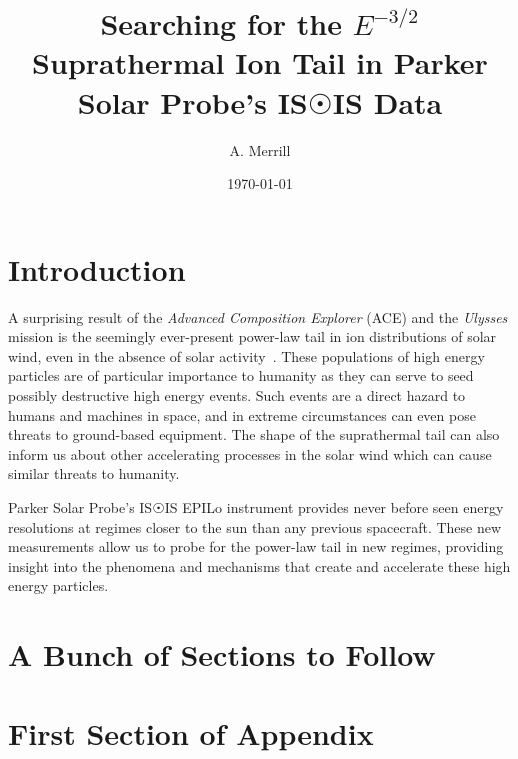 \documentclass[letterpaper,11pt]{article}
\begin{document}
\title{Searching for the $E^{-3/2}$ Suprathermal Ion Tail in Parker Solar Probe's IS$\Sun$IS Data}
\author{A. Merrill}
\date{\today}
\maketitle

\begin{abstract}
\lipsum[1]
\end{abstract}

\linenumbers

\section{Introduction}
\label{sec:intro}
A surprising result of the \textit{Advanced Composition Explorer} (ACE) and the \textit{Ulysses} mission is the seemingly ever-present power-law tail in ion distributions of solar wind, even in the absence of solar activity~\citep{Gloeckler_2000}.  These populations of high energy particles are of particular importance to humanity as they can serve to seed possibly destructive high energy events.  Such events are a direct hazard to humans and machines in space, and in extreme circumstances can even pose threats to ground-based equipment.  The shape of the suprathermal tail can also inform us about other accelerating processes in the solar wind which can cause similar threats to humanity.

Parker Solar Probe's IS$\Sun$IS EPILo instrument provides never before seen energy resolutions at regimes closer to the sun than any previous spacecraft.  These new measurements allow us to probe for the power-law tail in new regimes, providing insight into the phenomena and mechanisms that create and accelerate these high energy particles.

\section{A Bunch of Sections to Follow}
\lipsum[2]

\appendix
\section{First Section of Appendix}
\lipsum[3]



\end{document}
